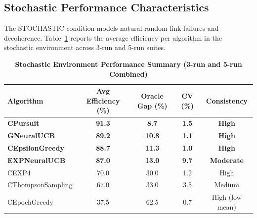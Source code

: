 \documentclass[12pt,a4paper]{article}
\newcommand{\performance}[1]{\textcolor{performancecolor}{\textbf{#1}}}
\newcommand{\stochastic}[1]{\textcolor{stochasticcolor}{\textbf{#1}}}
\newcommand{\legacy}[1]{\textcolor{legacycolor}{\textbf{#1}}}
\newcommand{\neural}[1]{\textcolor{neuralcolor}{\textbf{#1}}}
\begin{document}
\begin{tcolorbox}[colback=stochasticcolor!10,colframe=stochasticcolor,title=\textbf{Stochastic Environment Deep Analysis (1$\times$–2$\times$ Capacities, T/Tb Combined, 3-run/5-run)}]

\subsection{Stochastic Performance Characteristics}

The STOCHASTIC condition models natural random link failures and decoherence. Table~\ref{tab:stoch-performance} reports the average efficiency per algorithm in the stochastic environment across 3-run and 5-run suites.

\begin{table}[H]
\centering
\caption{\stochastic{Stochastic Environment Performance Summary (3-run and 5-run Combined)}}
\label{tab:stoch-performance}
\begin{tabular}{|l|c|c|c|c|}
\hline
\textbf{Algorithm} & \textbf{Avg Efficiency (\%)} & \textbf{Oracle Gap (\%)} & \textbf{CV (\%)} & \textbf{Consistency} \\
\hline
\hline
\stochastic{CPursuit}        & \stochastic{91.3} & \stochastic{8.7}  & \stochastic{1.5} & \stochastic{High} \\
\neural{GNeuralUCB}          & \neural{89.2} & \neural{10.8}     & \neural{1.1} & \neural{High} \\
\performance{CEpsilonGreedy} & \performance{88.7}                        & \performance{11.3} & \performance{1.0} & \performance{High} \\
\legacy{EXPNeuralUCB}        & \legacy{87.0}               & \legacy{13.0}     & \legacy{9.7}     & \legacy{Moderate} \\
CEXP4                        & 70.0                        & 30.0              & 1.2              & High \\
CThompsonSampling            & 67.0                        & 33.0              & 3.5              & Medium \\
CEpochGreedy                 & 37.5                        & 62.5              & 0.7              & High (low mean) \\
\hline
\end{tabular}
\end{table}


\end{tcolorbox}
\end{document}
